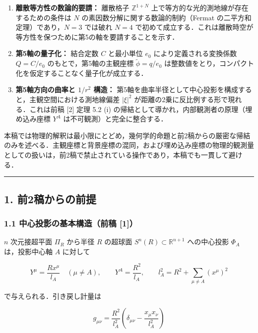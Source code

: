 \documentclass[a4paper,11pt]{ltjsarticle}
\theoremstyle{definition}
\begin{document}
\begin{enumerate}
\def\labelenumi{\arabic{enumi}.}
\item
  \textbf{離散等方性の数論的要請：} 離散格子 \(\mathbb{Z}^{1+N}\) 上で等方的な光的測地線が存在するための条件は \(N\) の素因数分解に関する数論的制約（Fermat の二平方和定理）であり，\(N=3\) では破れ \(N=4\) で初めて成立する．これは離散時空が等方性を保つために第5の軸を要請することを示す．
\item
  \textbf{第5軸の量子化：} 結合定数 \(C\) と最小単位 \(e_0\) により定義される変換係数 \(Q = C/e_0\) のもとで，第5軸の主観座標 \(\tilde{\phi} = q/e_0\) は整数値をとり，コンパクト化を仮定することなく量子化が成立する．
\item
  \textbf{第5軸方向の曲率と \(1/r^2\) 構造：} 第5軸を曲率半径として中心投影を構成すると，主観空間における測地線偏差 \(|\xi|^2\) が距離の2乗に反比例する形で現れる．これは前稿 {[}2{]} 定理 5.2 (i) の帰結として導かれ，内部観測者の原理（埋め込み座標 \(Y^A\) は不可観測）と完全に整合する．
\end{enumerate}

本稿では物理的解釈は最小限にとどめ，幾何学的命題と前2稿からの厳密な帰結のみを述べる．主観座標と背景座標の混同，および埋め込み座標の物理的観測量としての扱いは，前2稿で禁止されている操作であり，本稿でも一貫して避ける．

\begin{center}\rule{0.5\linewidth}{0.5pt}\end{center}

\subsection{1. 前2稿からの前提}\label{ux524d2ux7a3fux304bux3089ux306eux524dux63d0}

\subsubsection{1.1 中心投影の基本構造（前稿 {[}1{]}）}\label{ux4e2dux5fc3ux6295ux5f71ux306eux57faux672cux69cbux9020ux524dux7a3f-1}

\(n\) 次元接超平面 \(\Pi_R\) から半径 \(R\) の超球面 \(S^n(R) \subset \mathbb{R}^{n+1}\) への中心投影 \(\Phi_A\) は，投影中心軸 \(A\) に対して

\[Y^\mu = \frac{Rx^\mu}{l_A} \quad (\mu \neq A), \qquad Y^A = \frac{R^2}{l_A}, \qquad l_A^2 = R^2 + \sum_{\mu \neq A} (x^\mu)^2 \tag{1.1}\]

で与えられる．引き戻し計量は

\[g_{\mu\nu} = \frac{R^2}{l_A^2}\left(\delta_{\mu\nu} - \frac{x_\mu x_\nu}{l_A^2}\right) \tag{1.2}\]
\end{document}
